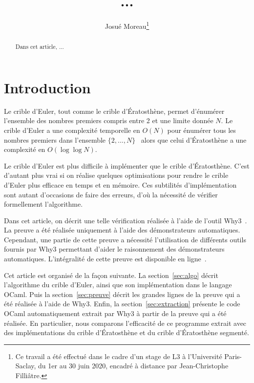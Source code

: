 \documentclass[a4paper]{easychair}
\begin{document}
\title{...}
\author{Josué Moreau\thanks{Ce travail a été effectué dans le cadre
    d'un stage de L3 à l'Université Paris-Saclay, du 1er au 30 juin
    2020, encadré à distance par Jean-Christophe Filliâtre.}}
\maketitle

\begin{abstract}
  Dans cet article, ...
\end{abstract}

\section{Introduction}


Le crible d'Euler, tout comme le crible d'Ératosthène, permet d'énumérer
l'ensemble des nombres premiers compris entre 2 et une limite donnée $N$.
Le crible d'Euler a une complexité temporelle en $O(N)$ pour énumérer tous les
nombres premiers dans l'ensemble $\{2,...,N\}$~\cite{crible-euler} alors que
celui d'Ératosthène a une complexité en $O(\log\log N)$.

Le crible d'Euler est plus difficile à implémenter que le crible d'Ératosthène.
C'est d'autant plus vrai si on réalise quelques optimisations pour
rendre le crible d'Euler plus efficace en temps et en mémoire.
Ces subtilités d'implémentation sont autant d'occasions de faire des erreurs,
d'où la nécessité de vérifier formellement l'algorithme.

Dans cet article, on décrit une telle vérification réalisée à l'aide de
l'outil Why3~\cite{why3}.
La preuve a été réalisée uniquement à l'aide des démonstrateurs automatiques.
Cependant, une partie de cette preuve a nécessité l'utilisation de différents
outils fournis par Why3 permettant d'aider le raisonnement des démonstrateurs
automatiques.
L'intégralité de cette preuve est disponible en ligne~\cite{mapreuve}.

Cet article est organisé de la façon suivante.
La section~\ref{sec:algo} décrit l'algorithme du crible d'Euler, ainsi que son
implémentation dans le langage OCaml.
Puis la section~\ref{sec:preuve} décrit les grandes lignes de la preuve qui a
été réalisée à l'aide de Why3.
Enfin, la section~\ref{sec:extraction} présente le code OCaml
automatiquement extrait par Why3 à partir
de la preuve qui a été réalisée. En particulier, nous comparons l'efficacité
de ce programme extrait avec des implémentations du crible d'Ératosthène et
du crible d'Ératosthène segmenté.
\end{document}
